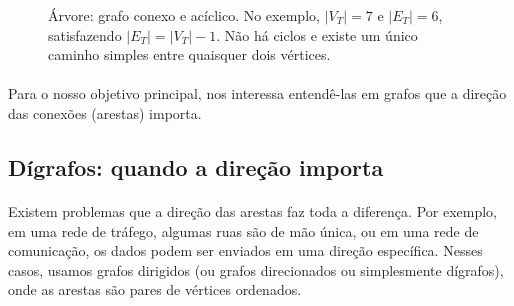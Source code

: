 \documentclass[12pt,a4paper]{article}
\def\\{}%
\def\emph#1{#1}%
\begin{document}
\begin{figure}[H]
\centering
{}
\caption{Árvore: grafo conexo e acíclico. No exemplo, $|V_T|=7$ e $|E_T|=6$, satisfazendo $|E_T|=|V_T|-1$. Não há ciclos e existe um único caminho simples entre quaisquer dois vértices.}
\label{fig:arvore}
\end{figure}

\paragraph{}
Para o nosso objetivo principal, nos interessa entendê-las em grafos que a direção das conexões (arestas) importa.

\subsection{Dígrafos: quando a direção importa}
\paragraph{}
Existem problemas que a direção das arestas faz toda a diferença. Por exemplo, em uma rede de tráfego, algumas ruas são de mão única, ou em uma rede de comunicação, os dados podem ser enviados em uma direção específica. Nesses casos, usamos \emph{grafos dirigidos} (ou grafos direcionados ou simplesmente dígrafos), onde as arestas são pares de vértices ordenados.
\end{document}
